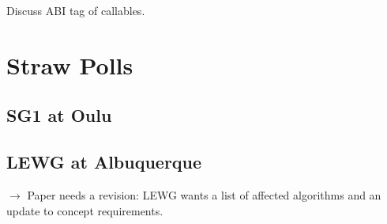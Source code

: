 \begin{revision}
\item Discuss ABI tag of  callables.
\end{revision}


\section{Straw Polls}
\subsection{SG1 at Oulu}

\subsection{LEWG at Albuquerque}
\noindent$\rightarrow$ Paper needs a revision: LEWG wants a list of affected algorithms and an update to concept requirements.






